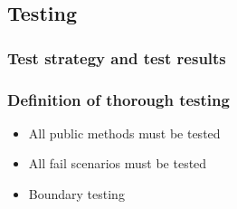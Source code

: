 \subsection{Testing}
\subsubsection{Test strategy and test results}
\subsubsection{Definition of thorough testing}
\begin{itemize}
  \item All public methods must be tested
  \item All fail scenarios must be tested
  \item Boundary testing
\end{itemize}
\newpage